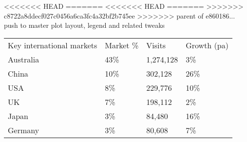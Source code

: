 <<<<<<< HEAD
=======
<<<<<<< HEAD
=======
>>>>>>> c8722a8ddecf027c0456a6ca3fc4a32bf2b745ee
>>>>>>> parent of e860186... push to master plot layout, legend and related tweaks
\begin{tabular}[t]{p{3.3cm}>{\hfill}p{1.1cm}>{\hfill}p{1.3cm}>{\hfill}p{1.4cm}}
 Key international markets & Market \% & Visits & Growth (pa) \\ 
 Australia & 43\% & 1,274,128 & 3\% \\ 
  China & 10\% &   302,128 & 26\% \\ 
  USA & 8\% &   229,776 & 10\% \\ 
  UK & 7\% &   198,112 & 2\% \\ 
  Japan & 3\% &    84,480 & 16\% \\ 
  Germany & 3\% &    80,608 & 7\% \\ 
  \end{tabular}
